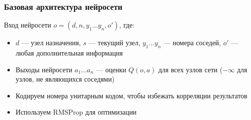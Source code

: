 \documentclass{beamer}
\begin{document}

\begin{frame}
  \frametitle{Базовая архитектура нейросети}
  Вход нейросети $o = (d, n, y_1 ... y_n, o')$, где:
  \begin{itemize}
  \item $d$ --- узел назначения, $s$ --- текущий узел, $y_1 ... y_n$ --- номера
    соседей, $o'$ --- любая дополнительная информация
  \item Выходы нейросети $a_1 ... a_n$ --- оценки $Q(o, a)$ для всех узлов сети
    ($-\infty$ для узлов, не являющихся соседями)
  \item Кодируем номера унитарным кодом, чтобы избежать корреляции результатов
  \item Используем RMSProp для оптимизации
  \end{itemize}
\end{frame}

\end{document}
